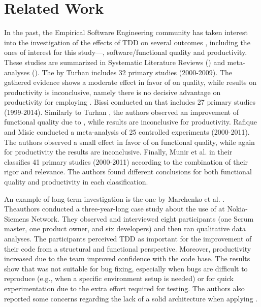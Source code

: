 \section{Related Work}
In the past, the Empirical Software Engineering community has taken interest into the investigation of the effects of TDD on several outcomes \cite{DBLP:conf/esem/FucciS0SSUTJO16} \cite{DBLP:journals/tse/ErdogmusMT05} \cite{DBLP:journals/infsof/Madeyski10}, including the ones of interest for this study—\ie, software/functional quality and productivity. These studies are summarized in Systematic Literature Reviews (\slrs) and meta-analyses (\eg \cite{DBLP:journals/infsof/BissiNE16, DBLP:journals/infsof/MunirMP14, DBLP:journals/tse/RafiqueM13, TDDEffective}).
The \slr by Turhan \etal \cite{TDDEffective} includes 32 primary studies (2000-2009). The gathered evidence shows a moderate effect in favor of \tdd on quality, while results on productivity is inconclusive, namely there is no decisive advantage on productivity for employing \tdd. Bissi \etal \cite{DBLP:journals/infsof/BissiNE16} conducted an \slr that includes 27 primary studies (1999-2014). 
Similarly to Turhan \etal \cite{TDDEffective}, the authors observed an improvement of functional quality due to \tdd, while results are inconclusive for productivity. Rafique and Misic \cite{DBLP:journals/tse/RafiqueM13} conducted a meta-analysis of 25 controlled experiments (2000-2011). The authors observed a small effect in favor of \tdd on functional quality, while again for productivity the results are inconclusive. 
Finally, Munir et al. \cite{DBLP:journals/infsof/MunirMP14,} in their \slr classifies 41 primary studies (2000-2011) according to the combination of their rigor and relevance. The authors found different conclusions for both functional quality and productivity in each classification.

An example of long-term investigation is the one by Marchenko et al. \cite{DBLP:conf/xpu/MarchenkoAI09}. Theauthors conducted a three-year-long case study about the use of \tdd at Nokia-Siemens Network. They observed and interviewed eight participants (one Scrum master, one product owner, and six developers) and then ran qualitative data analyses. The participants perceived TDD as important for the improvement of their code from a structural and functional perspective. Moreover, productivity increased due to the team improved confidence with the code base. The results show that \tdd was not suitable for bug fixing, especially when bugs are difficult to reproduce (e.g., when a specific environment setup is needed) or for quick experimentation due to the extra effort required for testing. The authors also reported some concerns regarding the lack of a solid architecture when applying \tdd.

